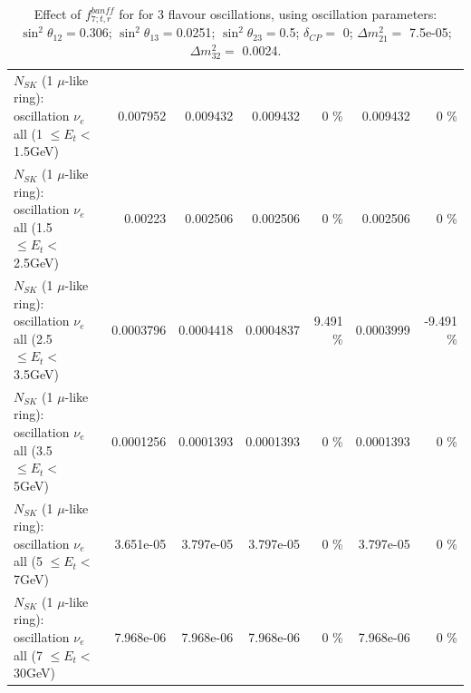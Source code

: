 \begin{table}
\begin{tabular}{| l | r | r | r  r | r  r |}
$N_{SK}$ (1 $\mu$-like ring): oscillation $\nu_{e}$ all (1 $\leq E_{t} <$ 1.5GeV) &        0.007952 &        0.009432 &        0.009432 &        0 \%  &        0.009432 &        0 \%  \\ 
$N_{SK}$ (1 $\mu$-like ring): oscillation $\nu_{e}$ all (1.5 $\leq E_{t} <$ 2.5GeV) &         0.00223 &        0.002506 &        0.002506 &        0 \%  &        0.002506 &        0 \%  \\ 
$N_{SK}$ (1 $\mu$-like ring): oscillation $\nu_{e}$ all (2.5 $\leq E_{t} <$ 3.5GeV) &       0.0003796 &       0.0004418 &       0.0004837 &    9.491 \%  &       0.0003999 &   -9.491 \%  \\ 
$N_{SK}$ (1 $\mu$-like ring): oscillation $\nu_{e}$ all (3.5 $\leq E_{t} <$ 5GeV) &       0.0001256 &       0.0001393 &       0.0001393 &        0 \%  &       0.0001393 &        0 \%  \\ 
 $N_{SK}$ (1 $\mu$-like ring): oscillation $\nu_{e}$ all (5 $\leq E_{t} <$ 7GeV) &       3.651e-05 &       3.797e-05 &       3.797e-05 &        0 \%  &       3.797e-05 &        0 \%  \\ 
$N_{SK}$ (1 $\mu$-like ring): oscillation $\nu_{e}$ all (7 $\leq E_{t} <$ 30GeV) &       7.968e-06 &       7.968e-06 &       7.968e-06 &        0 \%  &       7.968e-06 &        0 \%  \\ 
\hline
\hline
\end{tabular}
\caption{ Effect of $f_{7; t, r}^{banff}$ for for 3 flavour oscillations, using oscillation parameters:  $\sin^2\theta_{12} = $0.306; $\sin^2\theta_{13} = $0.0251; $\sin^2\theta_{23} = $0.5; $\delta_{CP} = $        0; $\Delta m^2_{21} = $    7.5e-05; $\Delta m^2_{32} = $    0.0024. }
\label{tab:num_banff_07_1RmuT_3f_osc_t13:0.0251}
\end{table}
\clearpage
